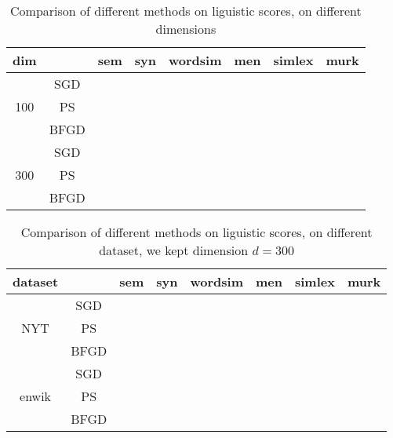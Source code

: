 \documentclass[letterpaper]{article} %
\begin{document}
\begin{table}[]
\begin{tabular}{|c|c|c|c|c|c|c|c|}
\hline
   dim      &      & sem & syn & wordsim & men & simlex & murk \\ \hline

\multirow{3}{*}{100} & SGD   &     &     &         &     &        &      \\ \cline{2-8} 
					 & PS   &     &     &         &     &        &      \\ \cline{2-8} 
                     & BFGD &     &     &         &     &        &      \\ \hline
\multirow{3}{*}{300} & SGD   &     &     &         &     &        &      \\ \cline{2-8} 
					 & PS   &     &     &         &     &        &      \\ \cline{2-8} 
                     & BFGD &     &     &         &     &        &      \\ \hline
\end{tabular}
\caption{Comparison of different methods on liguistic scores, on different dimensions}
\end{table}
\begin{table}[]
\begin{tabular}{|c|c|c|c|c|c|c|c|}
\hline
   dataset  &      & sem & syn & wordsim & men & simlex & murk \\ \hline

\multirow{3}{*}{NYT} & SGD   &     &     &         &     &        &      \\ \cline{2-8} 
					 & PS   &     &     &         &     &        &      \\ \cline{2-8} 
                     & BFGD &     &     &         &     &        &      \\ \hline
\multirow{3}{*}{enwik} & SGD   &     &     &         &     &        &      \\ \cline{2-8} 
					 & PS   &     &     &         &     &        &      \\ \cline{2-8} 
                     & BFGD &     &     &         &     &        &      \\ \hline
\end{tabular}
\caption{Comparison of different methods on liguistic scores, on different dataset, we kept dimension $d=300$}
\end{table}
\end{document}

